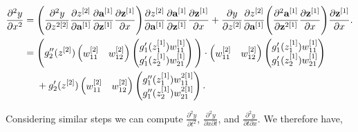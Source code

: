 \documentclass{article}
\begin{document}
\begin{align}
\frac{\partial^2 y}{\partial x^2} &= \Bigg{(} \frac{\partial^2 y}{\partial z^{2{[2]}}} \frac{\partial z^{[2]}}{\partial \textbf{a}^{[1]}} \frac{\partial \textbf{a}^{[1]}}{\partial \textbf{z}^{[1]}} \frac{\partial \textbf{z}^{[1]}}{\partial x} \Bigg{)} \frac{\partial z^{[2]}}{\partial \textbf{a}^{[1]}} \frac{\partial \textbf{a}^{[1]}}{\partial \textbf{z}^{[1]}}  \frac{\partial \textbf{z}^{[1]}}{\partial x} + 
\frac{\partial y}{\partial z^{[2]}} \frac{\partial z^{[2]}}{\partial \textbf{a}^{[1]}} \Bigg{(} \frac{\partial^2 \textbf{a}^{[1]}}{\partial \textbf{z}^{2{[1]}}}  \frac{\partial \textbf{z}^{[1]}}{\partial x} \Bigg{)}  \frac{\partial \textbf{z}^{[1]}}{\partial x}. \\
&=\Bigg{(} g_2''(z^{[2]}) 
\begin{pmatrix}
w_{11}^{[2]} & w_{12}^{[2]} 
\end{pmatrix}
\begin{pmatrix}
g_1'(z_1^{[1]}) w_{11}^{[1]} \\
g_1'(z_2^{[1]}) w_{21}^{[1]}
\end{pmatrix}
\Bigg{)}\cdot 
\begin{pmatrix}
w_{11}^{[2]} & w_{12}^{[2]} 
\end{pmatrix}
\begin{pmatrix}
g_1'(z_1^{[1]}) w_{11}^{[1]} \\
g_1'(z_2^{[1]}) w_{21}^{[1]}
\end{pmatrix}
\\
&~~~~ +g_2'(z^{[2]})
\begin{pmatrix}
w_{11}^{[2]} & w_{12}^{[2]} 
\end{pmatrix}
\begin{pmatrix}
g_1''(z_1^{[1]}) w_{11}^{2{[1]}}  \\
g_1''(z_2^{[1]}) w_{21}^{2{[1]}} \\
\end{pmatrix}.
\label{dy2dxlongmat} 
\end{align}

Considering similar steps we can compute $\frac{\partial^2 y}{\partial t^2}$, $\frac{\partial^2 y}{\partial x \partial t}$, and $\frac{\partial^2 y}{\partial t \partial x}$. We therefore have,
\end{document}
